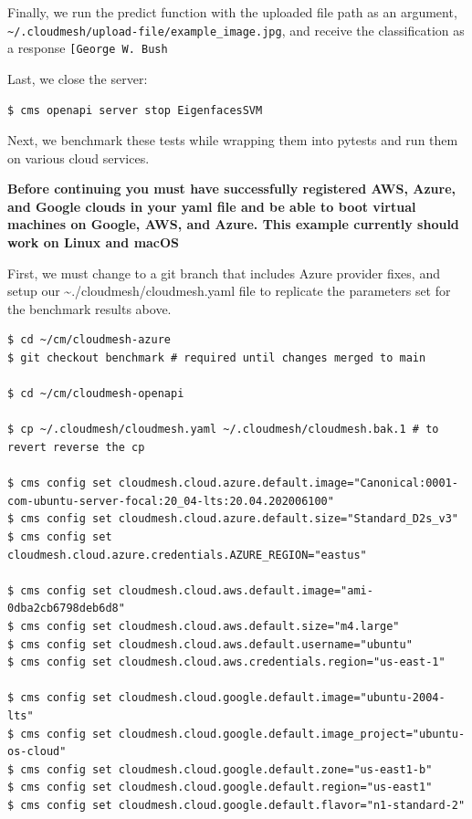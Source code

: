 Finally, we run the predict function with the uploaded file path as an
argument,
\texttt{\textasciitilde{}/.cloudmesh/upload-file/example\_image.jpg},
and receive the classification as a response
\texttt{{[}\textquotesingle{}George\ W.\ Bush\textquotesingle{}{]}}

Last, we close the server:

\begin{verbatim}
$ cms openapi server stop EigenfacesSVM
\end{verbatim}

Next, we benchmark these tests while wrapping them into pytests and run
them on various cloud services.

\textbf{Before continuing you must have successfully registered AWS,
Azure, and Google clouds in your yaml file and be able to boot virtual
machines on Google, AWS, and Azure. This example currently should work
on Linux and macOS}

First, we must change to a git branch that includes Azure provider
fixes, and setup our \textasciitilde./cloudmesh/cloudmesh.yaml file to
replicate the parameters set for the benchmark results above.

\begin{verbatim}
$ cd ~/cm/cloudmesh-azure 
$ git checkout benchmark # required until changes merged to main

$ cd ~/cm/cloudmesh-openapi

$ cp ~/.cloudmesh/cloudmesh.yaml ~/.cloudmesh/cloudmesh.bak.1 # to revert reverse the cp

$ cms config set cloudmesh.cloud.azure.default.image="Canonical:0001-com-ubuntu-server-focal:20_04-lts:20.04.202006100"
$ cms config set cloudmesh.cloud.azure.default.size="Standard_D2s_v3"
$ cms config set cloudmesh.cloud.azure.credentials.AZURE_REGION="eastus"

$ cms config set cloudmesh.cloud.aws.default.image="ami-0dba2cb6798deb6d8"
$ cms config set cloudmesh.cloud.aws.default.size="m4.large"
$ cms config set cloudmesh.cloud.aws.default.username="ubuntu"
$ cms config set cloudmesh.cloud.aws.credentials.region="us-east-1"

$ cms config set cloudmesh.cloud.google.default.image="ubuntu-2004-lts"
$ cms config set cloudmesh.cloud.google.default.image_project="ubuntu-os-cloud"
$ cms config set cloudmesh.cloud.google.default.zone="us-east1-b"
$ cms config set cloudmesh.cloud.google.default.region="us-east1"
$ cms config set cloudmesh.cloud.google.default.flavor="n1-standard-2"
\end{verbatim}

